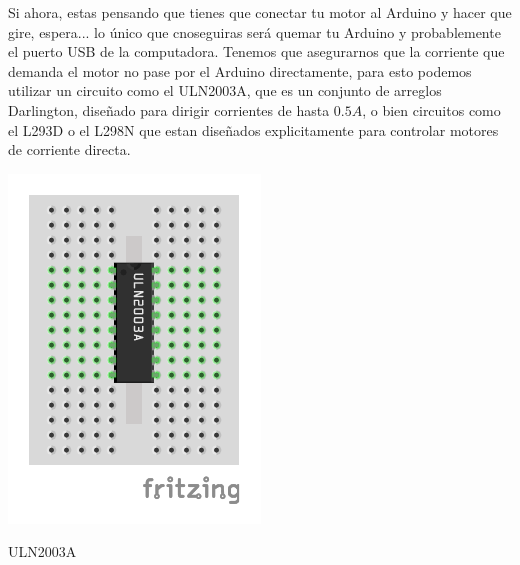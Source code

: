 		Si ahora, estas pensando que tienes que conectar tu motor al Arduino y hacer que gire, espera... lo único que cnoseguiras será quemar tu Arduino y probablemente el puerto USB de la computadora. Tenemos que asegurarnos que la corriente que demanda el motor no pase por el Arduino directamente, para esto podemos utilizar un circuito como el ULN2003A, que es un conjunto de arreglos Darlington, diseñado para dirigir corrientes de hasta $0.5A$, o bien circuitos como el L293D o el L298N que estan diseñados explicitamente para controlar motores de corriente directa.

		\begin{marginfigure}
			\begin{center}
				\includegraphics[width=\textwidth]{images/ULN2003A.pdf}
				\caption{ULN2003A}
				\label{fig:CI}
			\end{center}
		\end{marginfigure}


